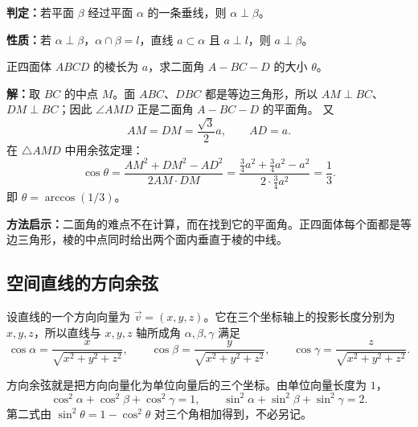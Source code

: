 \begin{lawbox}[面面垂直的判定与性质]
  \textbf{判定：}若平面 $\beta$ 经过平面 $\alpha$ 的一条垂线，则 $\alpha\perp\beta$。

  \textbf{性质：}若 $\alpha\perp\beta$，$\alpha\cap\beta=l$，直线 $a\subset\alpha$ 且 $a\perp l$，则 $a\perp\beta$。
\end{lawbox}

\begin{examplebox}[补充：正四面体的二面角]
  正四面体 $ABCD$ 的棱长为 $a$，求二面角 $A-BC-D$ 的大小 $\theta$。

  \begin{center}
  \end{center}

  \textbf{解：}取 $BC$ 的中点 $M$。面 $ABC$、$DBC$ 都是等边三角形，所以
  $AM\perp BC$、$DM\perp BC$；因此 $\angle AMD$ 正是二面角 $A-BC-D$ 的平面角。
  又
  \[
    AM=DM=\frac{\sqrt3}{2}a,\qquad AD=a.
  \]
  在 $\triangle AMD$ 中用余弦定理：
  \[
    \cos\theta=\frac{AM^2+DM^2-AD^2}{2AM\cdot DM}
    =\frac{\frac34a^2+\frac34a^2-a^2}{2\cdot\frac34a^2}
    =\boxed{\frac13}.
  \]
  即 $\theta=\arccos(1/3)$。

  \textbf{方法启示：}二面角的难点不在计算，而在找到它的平面角。正四面体每个面都是等边三角形，棱的中点同时给出两个面内垂直于棱的中线。
\end{examplebox}

\subsection{空间直线的方向余弦}

设直线的一个方向向量为 $\vec v=(x,y,z)$。它在三个坐标轴上的投影长度分别为 $x,y,z$，所以直线与
$x,y,z$ 轴所成角 $\alpha,\beta,\gamma$ 满足
\[
  \cos\alpha=\frac{x}{\sqrt{x^2+y^2+z^2}},\qquad
  \cos\beta =\frac{y}{\sqrt{x^2+y^2+z^2}},\qquad
  \cos\gamma=\frac{z}{\sqrt{x^2+y^2+z^2}}.
\]
\begin{corollarybox}[方向角的平方和]
  方向余弦就是把方向向量化为单位向量后的三个坐标。由单位向量长度为 $1$，
  \[
    \cos^2\alpha+\cos^2\beta+\cos^2\gamma=1,
    \qquad
    \sin^2\alpha+\sin^2\beta+\sin^2\gamma=2.
  \]
  第二式由 $\sin^2\theta=1-\cos^2\theta$ 对三个角相加得到，不必另记。
\end{corollarybox}

